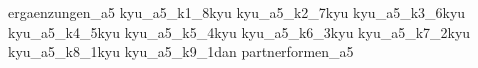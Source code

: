 
\usepackage{import}
\usepackage[backend=biber,style=numeric]{biblatex}

\AtBeginBibliography{\footnotesize}

	\nocite{*}
	{ergaenzungen_a5}\clearpage\pagebreak
	{kyu_a5_k1_8kyu}\clearpage\pagebreak
	{kyu_a5_k2_7kyu}\clearpage\pagebreak
	{kyu_a5_k3_6kyu}\clearpage\pagebreak
	{kyu_a5_k4_5kyu}\clearpage\pagebreak
	{kyu_a5_k5_4kyu}\clearpage\pagebreak
	{kyu_a5_k6_3kyu}\clearpage\pagebreak
	{kyu_a5_k7_2kyu}\clearpage\pagebreak
	{kyu_a5_k8_1kyu}\clearpage\pagebreak
	{kyu_a5_k9_1dan}\clearpage\pagebreak
	\AddToShipoutPictureFG{\ShowDraft}
	{partnerformen_a5}\clearpage\pagebreak
	\ClearShipoutPictureFG
	\twocolumn
	\printbibliography[title={\small Verwendete Literatur und Internetquellen}]

